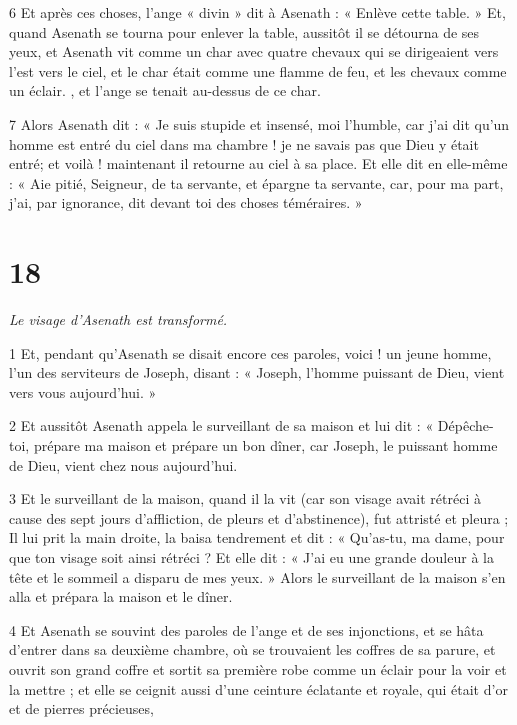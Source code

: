 \par 6 Et après ces choses, l'ange « divin » dit à Asenath : « Enlève cette table. » Et, quand Asenath se tourna pour enlever la table, aussitôt il se détourna de ses yeux, et Asenath vit comme un char avec quatre chevaux qui se dirigeaient vers l'est vers le ciel, et le char était comme une flamme de feu, et les chevaux comme un éclair. , et l'ange se tenait au-dessus de ce char.

\par 7 Alors Asenath dit : « Je suis stupide et insensé, moi l'humble, car j'ai dit qu'un homme est entré du ciel dans ma chambre ! je ne savais pas que Dieu y était entré; et voilà ! maintenant il retourne au ciel à sa place. Et elle dit en elle-même : « Aie pitié, Seigneur, de ta servante, et épargne ta servante, car, pour ma part, j'ai, par ignorance, dit devant toi des choses téméraires. »

\chapter{18}

\par \textit{Le visage d'Asenath est transformé.}

\par 1 Et, pendant qu'Asenath se disait encore ces paroles, voici ! un jeune homme, l'un des serviteurs de Joseph, disant : « Joseph, l'homme puissant de Dieu, vient vers vous aujourd'hui. »

\par 2 Et aussitôt Asenath appela le surveillant de sa maison et lui dit : « Dépêche-toi, prépare ma maison et prépare un bon dîner, car Joseph, le puissant homme de Dieu, vient chez nous aujourd'hui.

\par 3 Et le surveillant de la maison, quand il la vit (car son visage avait rétréci à cause des sept jours d'affliction, de pleurs et d'abstinence), fut attristé et pleura ; Il lui prit la main droite, la baisa tendrement et dit : « Qu'as-tu, ma dame, pour que ton visage soit ainsi rétréci ? Et elle dit : « J'ai eu une grande douleur à la tête et le sommeil a disparu de mes yeux. » Alors le surveillant de la maison s'en alla et prépara la maison et le dîner.

\par 4 Et Asenath se souvint des paroles de l'ange et de ses injonctions, et se hâta d'entrer dans sa deuxième chambre, où se trouvaient les coffres de sa parure, et ouvrit son grand coffre et sortit sa première robe comme un éclair pour la voir et la mettre ; et elle se ceignit aussi d'une ceinture éclatante et royale, qui était d'or et de pierres précieuses,

